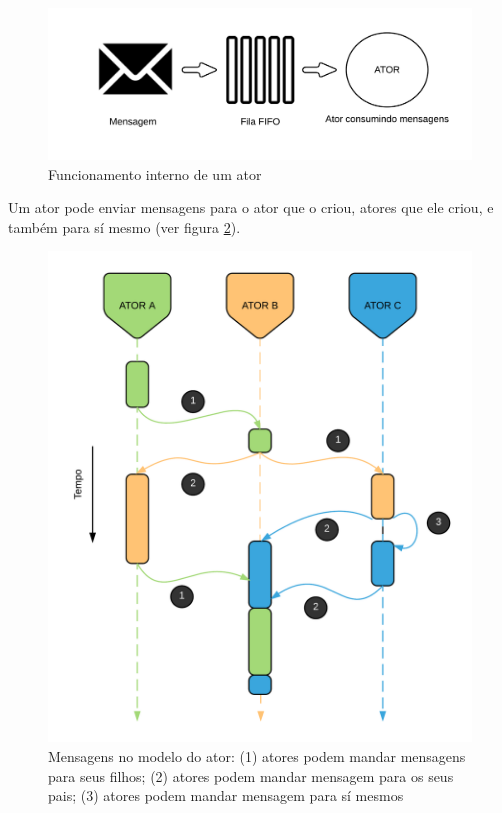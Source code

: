                 \begin{figure}
                    \centering
                    \includegraphics[width=0.9\linewidth]{fig/actor}
                    \caption{Funcionamento interno de um ator}
                    \label{fig:actor}
                \end{figure}
                
                Um ator pode enviar mensagens para o ator que o criou, atores que ele criou, e também para sí mesmo (ver figura \ref{fig:actormsg}).
                
                \begin{figure}
                    \centering
                    \includegraphics[width=0.9\linewidth]{fig/actormsg}
                    \caption{Mensagens no modelo do ator: (1) atores podem mandar mensagens para seus filhos; (2) atores podem mandar mensagem para os seus pais; (3) atores podem mandar mensagem para sí mesmos}
                    \label{fig:actormsg}
                \end{figure}
        
